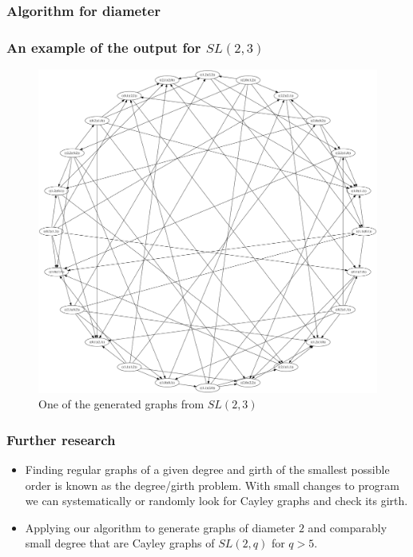 \documentclass{beamer}
\begin{document}
\begin{frame}
	\frametitle{Algorithm for diameter}
	
\end{frame}
\begin{frame}
	\frametitle{An example of the output for $SL(2,3)$}
	\begin{figure}[!ht]
 		\centering
 		\includegraphics[scale=0.12]{example.png}
		\caption{One of the generated graphs from $SL(2,3)$ }
	\end{figure}
\end{frame}
\begin{frame}
	\frametitle{Further research}
	\begin{itemize}
		\item Finding regular graphs of a given degree and girth of the smallest possible order is known as the degree/girth problem. With small changes to program we can systematically or randomly look for Cayley graphs and check its girth.
		\item Applying our algorithm to generate graphs of diameter $2$ and comparably small degree that are Cayley graphs of $SL(2,q)$ for $q>5$.
	\end{itemize}
\end{frame}
\end{document}
